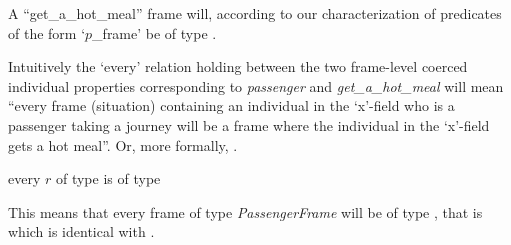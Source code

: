 A ``get\_a\_hot\_meal'' frame will, according to our characterization
of predicates of the form `$p$\_frame'  be of type \nexteg{}.
\begin{ex} 
\end{ex} 
Intuitively the `every'
relation holding between the two frame-level coerced individual
properties corresponding to \textit{passenger} and
\textit{get\_a\_hot\_meal} will mean ``every frame (situation)
containing an individual in the `x'-field who is a passenger taking a
journey will be a frame where the individual in the `x'-field gets a
hot meal''.  Or, more formally, \nexteg{}.
\begin{ex} 
every $r$ of type  
is of type   
\end{ex} 
This means that every frame of type \textit{PassengerFrame} will be of
type , that is  which is
      identical with .
